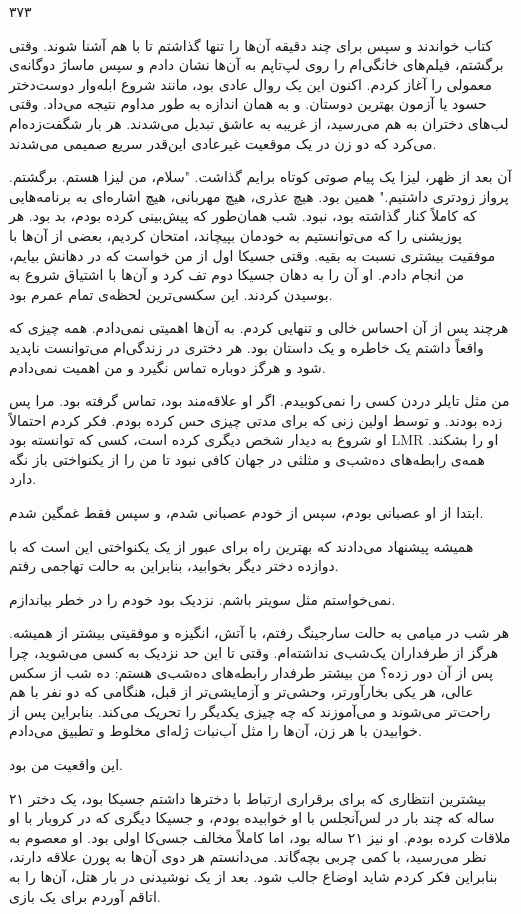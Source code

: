 ۳۷۳

کتاب خواندند و سپس برای چند دقیقه آن‌ها را تنها گذاشتم تا با هم آشنا شوند. وقتی برگشتم، فیلم‌های خانگی‌ام را روی لپ‌تاپم به آن‌ها نشان دادم و سپس ماساژ دوگانه‌ی معمولی را آغاز کردم. اکنون این یک روال عادی بود، مانند شروع ابله‌وار دوست‌دختر حسود یا آزمون بهترین دوستان. و به همان اندازه به طور مداوم نتیجه می‌داد. وقتی لب‌های دختران به هم می‌رسید، از غریبه به عاشق تبدیل می‌شدند. هر بار شگفت‌زده‌ام می‌کرد که دو زن در یک موقعیت غیرعادی این‌قدر سریع صمیمی می‌شدند.

آن بعد از ظهر، لیزا یک پیام صوتی کوتاه برایم گذاشت. "سلام، من لیزا هستم. برگشتم. پرواز زودتری داشتیم." همین بود. هیچ عذری، هیچ مهربانی، هیچ اشاره‌ای به برنامه‌هایی که کاملاً کنار گذاشته بود، نبود. شب همان‌طور که پیش‌بینی کرده بودم، بد بود. هر پوزیشنی را که می‌توانستیم به خودمان بپیچاند، امتحان کردیم، بعضی از آن‌ها با موفقیت بیشتری نسبت به بقیه. وقتی جسیکا اول از من خواست که در دهانش بیایم، من انجام دادم. او آن را به دهان جسیکا دوم تف کرد و آن‌ها با اشتیاق شروع به بوسیدن کردند. این سکسی‌ترین لحظه‌ی تمام عمرم بود.

هرچند پس از آن احساس خالی و تنهایی کردم. به آن‌ها اهمیتی نمی‌دادم. همه چیزی که واقعاً داشتم یک خاطره و یک داستان بود. هر دختری در زندگی‌ام می‌توانست ناپدید شود و هرگز دوباره تماس نگیرد و من اهمیت نمی‌دادم.

من مثل تایلر دردن کسی را نمی‌کوبیدم. اگر او علاقه‌مند بود، تماس گرفته بود. مرا پس زده بودند. و توسط اولین زنی که برای مدتی چیزی حس کرده بودم. فکر کردم احتمالاً او شروع به دیدار شخص دیگری کرده است، کسی که توانسته بود LMR او را بشکند. همه‌ی رابطه‌های ده‌شب‌ی و مثلثی در جهان کافی نبود تا من را از یکنواختی باز نگه دارد.

ابتدا از او عصبانی بودم، سپس از خودم عصبانی شدم، و سپس فقط غمگین شدم.

همیشه پیشنهاد می‌دادند که بهترین راه برای عبور از یک یکنواختی این است که با دوازده دختر دیگر بخوابید، بنابراین به حالت تهاجمی رفتم.

نمی‌خواستم مثل سویتر باشم. نزدیک بود خودم را در خطر بیاندازم.

هر شب در میامی به حالت سارجینگ رفتم، با آتش، انگیزه و موفقیتی بیشتر از همیشه. هرگز از طرفداران یک‌شب‌ی نداشته‌ام. وقتی تا این حد نزدیک به کسی می‌شوید، چرا پس از آن دور زده؟ من بیشتر طرفدار رابطه‌های ده‌شب‌ی هستم: ده شب از سکس عالی، هر یکی بخارآورتر، وحشی‌تر و آزمایشی‌تر از قبل، هنگامی که دو نفر با هم راحت‌تر می‌شوند و می‌آموزند که چه چیزی یکدیگر را تحریک می‌کند. بنابراین پس از خوابیدن با هر زن، آن‌ها را مثل آب‌نبات ژله‌ای مخلوط و تطبیق می‌دادم. 

این واقعیت من بود.

بیشترین انتظاری که برای برقراری ارتباط با دخترها داشتم جسیکا بود، یک دختر ۲۱ ساله که چند بار در لس‌آنجلس با او خوابیده بودم، و جسیکا دیگری که در کروبار با او ملاقات کرده بودم. او نیز ۲۱ ساله بود، اما کاملاً مخالف جسی‌کا اولی بود. او معصوم به نظر می‌رسید، با کمی چربی بچه‌گاند. می‌دانستم هر دوی آن‌ها به پورن علاقه دارند، بنابراین فکر کردم شاید اوضاع جالب شود. بعد از یک نوشیدنی در بار هتل، آن‌ها را به اتاقم آوردم برای یک بازی.